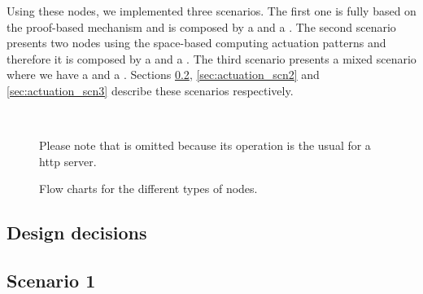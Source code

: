 Using these nodes, we implemented three scenarios.
The first one is fully based on the proof-based mechanism and is composed by a \prova{} and a \consc{}.
The second scenario presents two nodes using the space-based computing actuation patterns and therefore it is composed by a \provb{} and a \consd{}.
The third scenario presents a mixed scenario where we have a \prova{} and a \consd{}.
Sections \ref{sec:actuation_scn1}, \ref{sec:actuation_scn2} and \ref{sec:actuation_scn3} describe these scenarios respectively.


\begin{figure}
        \centering %
	~ %
        ~ %
        \caption{Flow charts for the different types of nodes.}
        {Please note that \typea{} is omitted because its operation is the usual for a \acs{http} server.} %
        \label{fig:flow_nodes}
\end{figure}


\subsection{Design decisions}





\subsection{Scenario 1}
\label{sec:actuation_scn1}

